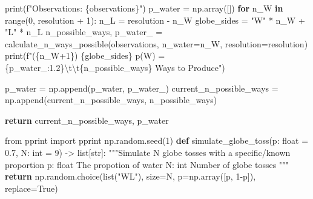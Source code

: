 \documentclass[
  letterpaper,
  DIV=11,
  numbers=noendperiod]{scrreprt}
\newenvironment{Shaded}{\begin{snugshade}}{\end{snugshade}}
\newcommand{\BuiltInTok}[1]{\textcolor[rgb]{0.00,0.23,0.31}{#1}}
\newcommand{\CharTok}[1]{\textcolor[rgb]{0.13,0.47,0.30}{#1}}
\newcommand{\CommentTok}[1]{\textcolor[rgb]{0.37,0.37,0.37}{#1}}
\newcommand{\ControlFlowTok}[1]{\textcolor[rgb]{0.00,0.23,0.31}{\textbf{#1}}}
\newcommand{\DecValTok}[1]{\textcolor[rgb]{0.68,0.00,0.00}{#1}}
\newcommand{\FloatTok}[1]{\textcolor[rgb]{0.68,0.00,0.00}{#1}}
\newcommand{\ImportTok}[1]{\textcolor[rgb]{0.00,0.46,0.62}{#1}}
\newcommand{\KeywordTok}[1]{\textcolor[rgb]{0.00,0.23,0.31}{\textbf{#1}}}
\newcommand{\NormalTok}[1]{\textcolor[rgb]{0.00,0.23,0.31}{#1}}
\newcommand{\OperatorTok}[1]{\textcolor[rgb]{0.37,0.37,0.37}{#1}}
\newcommand{\SpecialCharTok}[1]{\textcolor[rgb]{0.37,0.37,0.37}{#1}}
\newcommand{\SpecialStringTok}[1]{\textcolor[rgb]{0.13,0.47,0.30}{#1}}
\newcommand{\StringTok}[1]{\textcolor[rgb]{0.13,0.47,0.30}{#1}}
\newcommand{\VariableTok}[1]{\textcolor[rgb]{0.07,0.07,0.07}{#1}}
\begin{document}
\begin{Shaded}
\begin{Highlighting}[]
    \BuiltInTok{print}\NormalTok{(}\SpecialStringTok{f"Observations: \textquotesingle{}}\SpecialCharTok{\{}\NormalTok{observations}\SpecialCharTok{\}}\SpecialStringTok{\textquotesingle{}"}\NormalTok{)}
\NormalTok{    p\_water }\OperatorTok{=}\NormalTok{ np.array([])}
    \ControlFlowTok{for}\NormalTok{ n\_W }\KeywordTok{in} \BuiltInTok{range}\NormalTok{(}\DecValTok{0}\NormalTok{, resolution }\OperatorTok{+} \DecValTok{1}\NormalTok{):}
\NormalTok{        n\_L }\OperatorTok{=}\NormalTok{ resolution }\OperatorTok{{-}}\NormalTok{ n\_W}
\NormalTok{        globe\_sides }\OperatorTok{=} \StringTok{"W"} \OperatorTok{*}\NormalTok{ n\_W }\OperatorTok{+} \StringTok{"L"} \OperatorTok{*}\NormalTok{ n\_L}
\NormalTok{        n\_possible\_ways, p\_water\_ }\OperatorTok{=}\NormalTok{ calculate\_n\_ways\_possible(observations, n\_water}\OperatorTok{=}\NormalTok{n\_W, resolution}\OperatorTok{=}\NormalTok{resolution)}
        \BuiltInTok{print}\NormalTok{(}\SpecialStringTok{f"(}\SpecialCharTok{\{}\NormalTok{n\_W}\OperatorTok{+}\DecValTok{1}\SpecialCharTok{\}}\SpecialStringTok{) }\SpecialCharTok{\{}\NormalTok{globe\_sides}\SpecialCharTok{\}}\SpecialStringTok{ p(W) = }\SpecialCharTok{\{}\NormalTok{p\_water\_}\SpecialCharTok{:1.2\}}\CharTok{\textbackslash{}t\textbackslash{}t}\SpecialCharTok{\{}\NormalTok{n\_possible\_ways}\SpecialCharTok{\}}\SpecialStringTok{ Ways to Produce"}\NormalTok{)}

\NormalTok{        p\_water }\OperatorTok{=}\NormalTok{ np.append(p\_water, p\_water\_)}
\NormalTok{        current\_n\_possible\_ways }\OperatorTok{=}\NormalTok{ np.append(current\_n\_possible\_ways, n\_possible\_ways)}

    \ControlFlowTok{return}\NormalTok{ current\_n\_possible\_ways, p\_water}

\ImportTok{from}\NormalTok{ pprint }\ImportTok{import}\NormalTok{ pprint}
\NormalTok{np.random.seed(}\DecValTok{1}\NormalTok{)}
\KeywordTok{def}\NormalTok{ simulate\_globe\_toss(p: }\BuiltInTok{float} \OperatorTok{=} \FloatTok{0.7}\NormalTok{, N: }\BuiltInTok{int} \OperatorTok{=} \DecValTok{9}\NormalTok{) }\OperatorTok{{-}\textgreater{}} \BuiltInTok{list}\NormalTok{[}\BuiltInTok{str}\NormalTok{]:}
    \CommentTok{"""Simulate N globe tosses with a specific/known proportion}
\CommentTok{    p: float}
\CommentTok{        The propotion of water}
\CommentTok{    N: int}
\CommentTok{        Number of globe tosses}
\CommentTok{    """}
    \ControlFlowTok{return}\NormalTok{ np.random.choice(}\BuiltInTok{list}\NormalTok{(}\StringTok{"WL"}\NormalTok{),  size}\OperatorTok{=}\NormalTok{N, p}\OperatorTok{=}\NormalTok{np.array([p, }\DecValTok{1}\OperatorTok{{-}}\NormalTok{p]), replace}\OperatorTok{=}\VariableTok{True}\NormalTok{)}
\end{Highlighting}
\end{Shaded}
\end{document}
